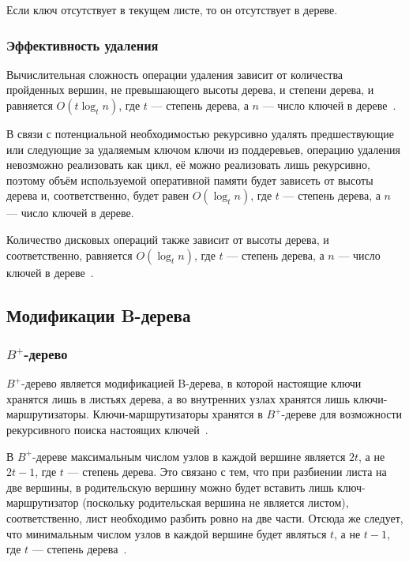 \documentclass[a4paper,12pt]{article}
\begin{document}
	Если ключ отсутствует в текущем листе, то он отсутствует в дереве.
	
	\subsubsection{Эффективность удаления}
	
	Вычислительная сложность операции удаления зависит от количества пройденных вершин, не превышающего высоты дерева, и степени дерева, и равняется $O(t\log_t n)$, где $t$ --- степень дерева, а $n$ --- число ключей в дереве~\cite{Kormen}.
	
	В связи с потенциальной необходимостью рекурсивно удалять предшествующие или следующие за удаляемым ключом ключи из поддеревьев, операцию удаления невозможно реализовать как цикл, её можно реализовать лишь рекурсивно, поэтому объём используемой оперативной памяти будет зависеть от высоты дерева и, соответственно, будет равен $O(\log_t n)$, где $t$ --- степень дерева, а $n$ --- число ключей в дереве.
	
	Количество дисковых операций также зависит от высоты дерева, и соответственно, равняется $O(\log_t n)$, где $t$ --- степень дерева, а $n$ --- число ключей в дереве~\cite{Kormen}.
	
	\subsection{Модификации B-дерева}
	
	\subsubsection{$B^+$-дерево}
	
	$B^+$-дерево является модификацией B-дерева, в которой настоящие ключи хранятся лишь в листьях дерева, а во внутренних узлах хранятся лишь ключи-маршрутизаторы. Ключи-маршрутизаторы хранятся в $B^+$-дереве для возможности рекурсивного поиска настоящих ключей~\cite{Kerttu}.
	
	В $B^+$-дереве максимальным числом узлов в каждой вершине является $2t$, а не $2t-1$, где $t$ --- степень дерева. Это связано с тем, что при разбиении листа на две вершины, в родительскую вершину можно будет вставить лишь ключ-маршрутизатор (поскольку родительская вершина не является листом), соответственно, лист необходимо разбить ровно на две части. Отсюда же следует, что минимальным числом узлов в каждой вершине будет являться $t$, а не $t-1$, где $t$ --- степень дерева~\cite{Kerttu}.
	
\end{document}
